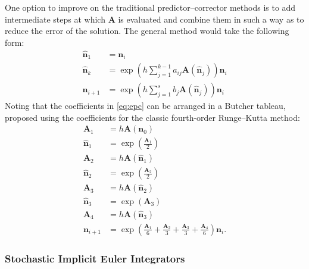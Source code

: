 \documentclass[3p,authoryear]{elsarticle}
\newcommand{\vect}[1]{\mathbf{#1}} %
\begin{document}
One option to improve on the traditional predictor--corrector methods is to add
intermediate steps at which $\vect{A}$ is evaluated and combine them in such a
way as to reduce the error of the solution. The general method would take the
following form:
\begin{equation}
  \label{eq:epc}
  \begin{split}
    \hat{\vect{n}}_1 &= \vect{n}_i \\
    \hat{\vect{n}}_k &= \exp \left( h \sum_{j=1}^{k-1} a_{ij} \vect{A}(\hat{\vect{n}}_j) \right) \vect{n}_i \\
    \vect{n}_{i+1} &= \exp \left( h \sum_{j=1}^{s} b_{j} \vect{A}(\hat{\vect{n}}_j) \right) \vect{n}_i
  \end{split}
\end{equation}
Noting that the coefficients in \cref{eq:epc} can be arranged in a Butcher
tableau, \citet{josey2016jcp} proposed using the coefficients for the classic
fourth-order Runge--Kutta method:
\begin{equation}
  \begin{split}
    \vect{A}_1 &= h\vect{A}(\vect{n}_0) \\
    \hat{\vect{n}}_1 &= \exp \left ( \frac{\vect{A}_1}{2} \right ) \\
    \vect{A}_2 &= h\vect{A}(\hat{\vect{n}}_1) \\
    \hat{\vect{n}}_2 &= \exp \left ( \frac{\vect{A}_2}{2} \right ) \\
    \vect{A}_3 &= h \vect{A}(\hat{\vect{n}}_2) \\
    \hat{\vect{n}}_3 &= \exp \left ( \vect{A}_3 \right ) \\
    \vect{A}_4 &= h\vect{A}(\hat{\vect{n}}_3) \\
    \vect{n}_{i+1} &= \exp \left ( \frac{\vect{A}_1}{6} + \frac{\vect{A}_2}{3}
      + \frac{\vect{A}_3}{3} + \frac{\vect{A}_4}{6} \right ) \vect{n}_i.
  \end{split}
\end{equation}

\subsubsection{Stochastic Implicit Euler Integrators}
\end{document}
